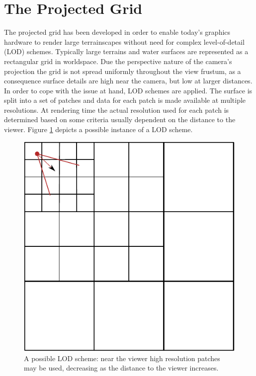 \section{The Projected Grid}
The projected grid has been developed in order to enable today's graphics
hardware to render large terrainscapes without need for complex
level-of-detail (LOD) schemes. Typically large terrains and water surfaces are
represented as a rectangular grid in worldspace. Due the perspective nature of
the camera's projection the grid is not spread uniformly throughout the view
frustum, as a consequence surface details are high near the camera, but low at
larger distances. In order to cope with the issue at hand, LOD schemes are
applied. The surface is split into a set of patches and data for each patch is
made available at multiple resolutions. At rendering time the actual resolution
used for each patch is determined based on some criteria usually dependent on
the distance to the viewer. Figure \ref{fig:lodscheme} depicts a possible
instance of a LOD scheme.
\begin{figure}
\begin{center}
\includegraphics[scale=0.8]{Images/LODScheme.pdf}
\caption[LOD scheme]{A possible LOD scheme: near the viewer high resolution
patches may be used, decreasing as the distance to the viewer increases. }
\label{fig:lodscheme}
\end{center}
\end{figure}
